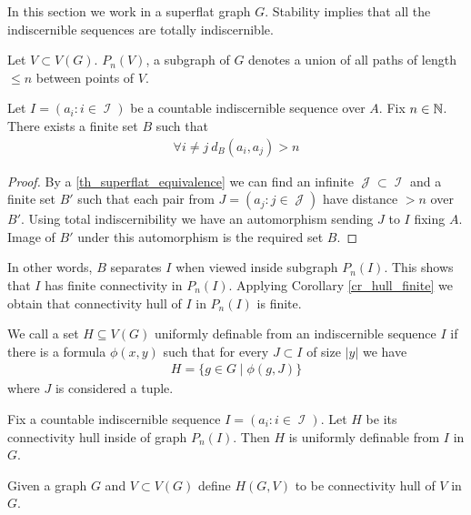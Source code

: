 \documentclass{amsart}
\DeclareMathOperator{\I}{\mathcal I}
\DeclareMathOperator{\J}{\mathcal J}
\begin{document}
In this section we work in a superflat graph $G$. Stability implies that all the indiscernible sequences are totally indiscernible.

\begin{Definition}
	Let $V \subset V(G)$. $P_n(V)$, a subgraph of $G$ denotes a union of all paths of length $\leq n$ between points of $V$.
\end{Definition}

\begin{Lemma} \label{lm_bump}
	Let $I = (a_i : i \in \I)$ be a countable indiscernible sequence over $A$. Fix $n \in \mathbb{N}$.
	There exists a finite set $B$ such that
	\begin{align*}
		\forall i \neq j \ d_B(a_i, a_j) > n
	\end{align*}
\end{Lemma}

\begin{proof}
	By a \ref{th_superflat_equivalence} we can find an infinite $\J \subset \I$ and a finite set $B'$ such that each pair from $J = (a_j : j \in \J)$ have distance $>n$ over $B'$.
	Using total indiscernibility we have an automorphism sending $J$ to $I$ fixing $A$.
	Image of $B'$ under this automorphism is the required set $B$.
\end{proof}

In other words, $B$ separates $I$ when viewed inside subgraph $P_n(I)$.
This shows that $I$ has finite connectivity in $P_n(I)$.
Applying Corollary \ref{cr_hull_finite} we obtain that connectivity hull of $I$ in $P_n(I)$ is finite.

\begin{Definition}
	We call a set $H \subseteq V(G)$ uniformly definable from an indiscernible sequence $I$ if there is a formula $\phi(x, y)$ such that for every $J \subset I$ of size $|y|$ we have
	\begin{align*}
		H = \{g \in G \mid \phi(g, J)\}
	\end{align*}
	where $J$ is considered a tuple.
\end{Definition}

\begin{Lemma} \label{lm_uniform}
	Fix a countable indiscernible sequence $I = (a_i : i \in \I)$.
	Let $H$ be its connectivity hull inside of graph $P_n(I)$.
	Then $H$ is uniformly definable from $I$ in $G$.
\end{Lemma}

\begin{Definition}
	Given a graph $G$ and $V \subset V(G)$ define $H(G, V)$ to be connectivity hull of $V$ in $G$.
\end{Definition}
\end{document}
